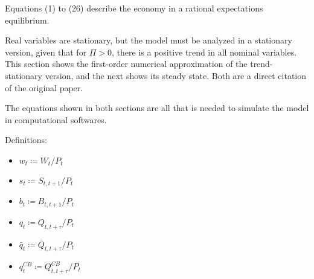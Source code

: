 \documentclass[12pt]{article}
\begin{document}
Equations (1) to (26) describe the economy in a rational expectations equilibrium.

Real variables are stationary, but the model must be analyzed in a stationary version, given that for $\Pi > 0$, there is a positive trend in all nominal variables. This section shows the first-order numerical approximation of the trend-stationary version, and the next shows its steady state. Both are a direct citation of the original paper.

The equations shown in both sections are all that is needed to simulate the model in computational softwares.

Definitions:
\begin{itemize}
    \item $w_{t} \coloneqq W_{t} / P_{t}$
    \item $s_{t} \coloneqq S_{t, t+1} / P_{t}$
    \item $b_{t} \coloneqq B_{t, t+1} / P_{t}$
    \item $q_{t} \coloneqq Q_{t, t+\tau} / P_{t}$
    \item $\bar{q}_{t} \coloneqq \bar{Q}_{t, t+\tau} / P_{t}$
    \item $q_{t}^{C B} \coloneqq Q_{t, t+\tau}^{C B} / P_{t}$
\end{itemize}

\renewcommand{\theequation}{B.\arabic{equation}}
\end{document}
